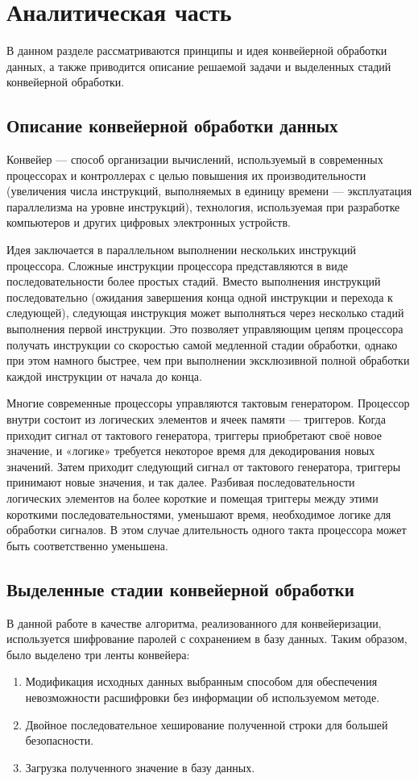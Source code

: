 \documentclass[12pt]{report}
\begin{document}
    \chapter{Аналитическая часть}	
    В данном разделе рассматриваются принципы и идея конвейерной обработки данных, а также приводится описание решаемой задачи и выделенных стадий конвейерной обработки.
    
    \section{Описание конвейерной обработки данных}
    Конвейер\cite{conveyor} — способ организации вычислений, используемый в современных процессорах и контроллерах с целью повышения их производительности (увеличения числа инструкций, выполняемых в единицу времени — эксплуатация параллелизма на уровне инструкций), технология, используемая при разработке компьютеров и других цифровых электронных устройств.
    
    Идея заключается в параллельном выполнении нескольких инструкций процессора. Сложные инструкции процессора представляются в виде последовательности более простых стадий. Вместо выполнения инструкций последовательно (ожидания завершения конца одной инструкции и перехода к следующей), следующая инструкция может выполняться через несколько стадий выполнения первой инструкции. Это позволяет управляющим цепям процессора получать инструкции со скоростью самой медленной стадии обработки, однако при этом намного быстрее, чем при выполнении эксклюзивной полной обработки каждой инструкции от начала до конца.
    
    Многие современные процессоры управляются тактовым генератором. Процессор внутри состоит из логических элементов и ячеек памяти — триггеров. Когда приходит сигнал от тактового генератора, триггеры приобретают своё новое значение, и «логике» требуется некоторое время для декодирования новых значений. Затем приходит следующий сигнал от тактового генератора, триггеры принимают новые значения, и так далее. Разбивая последовательности логических элементов на более короткие и помещая триггеры между этими короткими последовательностями, уменьшают время, необходимое логике для обработки сигналов. В этом случае длительность одного такта процессора может быть соответственно уменьшена.
    
    \section{Выделенные стадии конвейерной обработки}
    В данной работе в качестве алгоритма, реализованного для конвейеризации, используется шифрование паролей с сохранением в базу данных. Таким образом, было выделено три ленты конвейера:
    \begin{enumerate}
    	\item Модификация исходных данных выбранным способом для обеспечения невозможности расшифровки без информации об используемом методе.
    	\item Двойное последовательное хеширование полученной строки для большей безопасности.
    	\item Загрузка полученного значение в базу данных.
    \end{enumerate}
    
\end{document}
